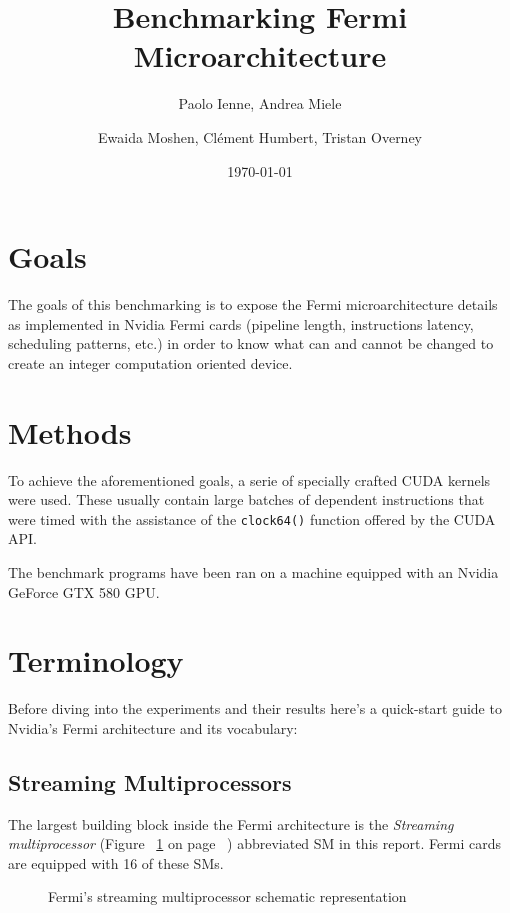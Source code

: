 \documentclass{article}
\def \scalingfactor{.8}
\begin{document}
\title{Benchmarking Fermi Microarchitecture}
\author{Paolo Ienne, Andrea Miele\and Ewaida Moshen, Cl\'{e}ment Humbert, Tristan Overney}
\date{\today}
\maketitle

\section{Goals}
	The goals of this benchmarking is to expose the Fermi microarchitecture details
    as implemented in Nvidia Fermi cards (pipeline length, instructions latency,
    scheduling patterns, etc.) in order to know what can and cannot be changed
    to create an integer computation oriented device.

\section{Methods}
	To achieve the aforementioned goals, a serie of specially crafted CUDA kernels
	were used. These usually contain large batches of dependent instructions that were 
	timed with the assistance of the \texttt{clock64()} function offered by the CUDA API.

	The benchmark programs have been ran on a machine equipped with an Nvidia
    GeForce GTX 580 GPU.

\section{Terminology}
    Before diving into the experiments and their results here's a quick-start
    guide to Nvidia's Fermi architecture and its vocabulary:

    \subsection{Streaming Multiprocessors}
    The largest building block inside the Fermi architecture is the 
    \emph{Streaming multiprocessor} (Figure ~\ref{fig:SM} on page 
    ~\pageref{fig:SM}) abbreviated SM in this report. Fermi cards are equipped
    with 16 of these SMs.
    \begin{figure}[H]
    \centering
        
        \caption{Fermi's streaming multiprocessor schematic representation}
        \label{fig:SM}
    \end{figure}
\end{document}
